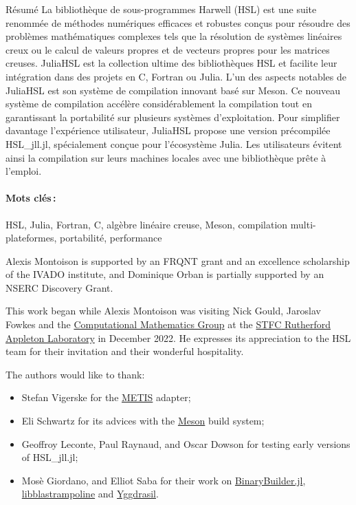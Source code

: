 \documentclass[gdweb]{geradwp}
\newcommand{\JuliaHSL}{JuliaHSL\xspace}  %
\newcommand{\HSLjll}{HSL\_jll.jl}
\begin{document}
\begin{GDabstract}{R\'esum\'e}
La bibliothèque de sous-programmes Harwell (HSL) est une suite renommée de méthodes numériques efficaces et robustes conçus pour résoudre des problèmes mathématiques complexes tels que la résolution de systèmes linéaires creux ou le calcul de valeurs propres et de vecteurs propres pour les matrices creuses.
\JuliaHSL est la collection ultime des bibliothèques HSL et facilite leur intégration dans des projets en C, Fortran ou Julia.
L'un des aspects notables de \JuliaHSL est son système de compilation innovant basé sur Meson.
Ce nouveau système de compilation accélère considérablement la compilation tout en garantissant la portabilité sur plusieurs systèmes d'exploitation.
Pour simplifier davantage l'expérience utilisateur, \JuliaHSL propose une version précompilée \HSLjll, spécialement conçue pour l'écosystème Julia.
Les utilisateurs évitent ainsi la compilation sur leurs machines locales avec une bibliothèque prête à l'emploi.

\paragraph{Mots cl\'es\,: }
HSL, Julia, Fortran, C, alg\`ebre lin\'eaire creuse, Meson, compilation multi-plateformes, portabilit\'e, performance
\end{GDabstract}

\begin{GDacknowledgements}
Alexis Montoison is supported by an FRQNT grant and an excellence scholarship of the IVADO institute, and Dominique Orban is partially supported by an NSERC Discovery Grant.

This work began while Alexis Montoison was visiting Nick Gould, Jaroslav Fowkes and the \href{https://www.numerical.rl.ac.uk/}{Computational Mathematics Group} at the \href{https://www.ukri.org/about-us/stfc/locations/rutherford-appleton-laboratory/}{STFC Rutherford Appleton Laboratory} in December 2022.
He expresses its appreciation to the HSL team for their invitation and their wonderful hospitality.

The authors would like to thank:
\begin{itemize}
  \item Stefan Vigerske for the \href{https://github.com/KarypisLab/METIS}{METIS} adapter;
  \item Eli Schwartz for its advices with the \href{https://mesonbuild.com/}{Meson} build system;
  \item Geoffroy Leconte, Paul Raynaud, and Oscar Dowson for testing early versions of \HSLjll;
  \item Mosè Giordano, and Elliot Saba for their work on \href{https://github.com/JuliaPackaging/BinaryBuilder.jl}{BinaryBuilder.jl}, \href{https://github.com/JuliaLinearAlgebra/libblastrampoline}{libblastrampoline} and \href{https://github.com/JuliaPackaging/Yggdrasil}{Yggdrasil}.
\end{itemize}
\end{GDacknowledgements}
\end{document}
